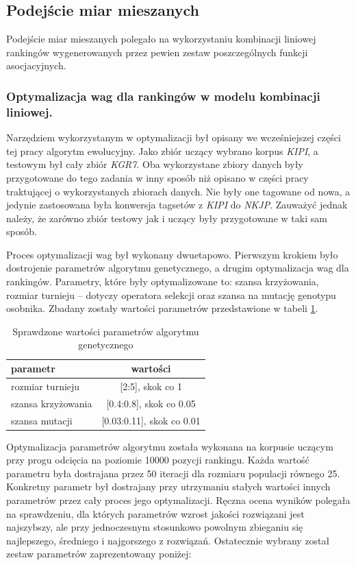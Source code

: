 \documentclass[11pt,a4paper]{llncs}
\begin{document}
\subsection{Podejście miar mieszanych}

Podejście miar mieszanych polegało na wykorzystaniu kombinacji liniowej rankingów wygenerowanych przez pewien zestaw poszczególnych funkcji asocjacyjnych.

\subsubsection{Optymalizacja wag dla rankingów w modelu kombinacji liniowej.}

Narzędziem wykorzystanym w optymalizacji był opisany we wcześniejszej części tej pracy algorytm ewolucyjny.
Jako zbiór uczący wybrano korpus \emph{KIPI}, a testowym był cały zbiór \emph{KGR7}.
Oba wykorzystane zbiory danych były przygotowane do tego zadania w inny sposób niż opisano w części pracy traktującej o wykorzystanych zbiorach danych.
Nie były one tagowane od nowa, a jedynie zastosowana była konwersja tagsetów z \emph{KIPI} do \emph{NKJP}.
Zauważyć jednak należy, że zarówno zbiór testowy jak i uczący były przygotowane w taki sam sposób.

Proces optymalizacji wag był wykonany dwuetapowo.
Pierwszym krokiem było dostrojenie parametrów algorytmu genetycznego, a drugim optymalizacja wag dla rankingów.
Parametry, które były optymalizowane to: szansa krzyżowania, rozmiar turnieju -- dotyczy operatora selekcji oraz szansa na mutację genotypu osobnika.
Zbadany zostały wartości parametrów przedstawione w tabeli \ref{optimizer_parameters_optimization}.
\begin{table}[h!]
\centering
\begin{tabular}{ l | c }
	\toprule
	parametr & wartości \\
	\midrule
	rozmiar turnieju & [2:5], skok co 1\\
	szansa krzyżowania & [0.4:0.8], skok co 0.05\\
	szansa mutacji & [0.03:0.11], skok co 0.01\\ 
	\bottomrule
\end{tabular}
\caption[Sprawdzone wartości parametrów algorytmu genetycznego]{Sprawdzone wartości parametrów algorytmu genetycznego}
\label{optimizer_parameters_optimization}
\end{table}

Optymalizacja parametrów algorytmu została wykonana na korpusie uczącym przy progu odcięcia na poziomie 10000 pozycji rankingu.
Każda wartość parametru była dostrajana przez 50 iteracji dla rozmiaru populacji równego 25.
Konkretny parametr był dostrajany przy utrzymaniu stałych wartości innych parametrów przez cały proces jego optymalizacji.
Ręczna ocena wyników polegała na sprawdzeniu, dla których parametrów wzrost jakości rozwiązani jest najszybszy, ale przy jednoczesnym stosunkowo powolnym zbieganiu się najlepszego, średniego i najgorszego z rozwiązań.
Ostatecznie wybrany został zestaw parametrów zaprezentowany poniżej:
\end{document}
